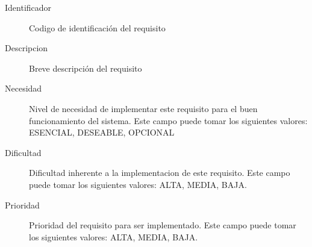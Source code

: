 \begin{description}
    \item[Identificador] Codigo de identificación del requisito
    \item[Descripcion] Breve descripción del requisito
    \item[Necesidad] Nivel de necesidad de implementar este requisito para el buen funcionamiento del sistema. Este campo puede tomar los siguientes valores: ESENCIAL, DESEABLE, OPCIONAL
    \item[Dificultad] Dificultad inherente a la implementacion de este requisito. Este campo puede tomar los siguientes valores: ALTA, MEDIA, BAJA.
    \item[Prioridad] Prioridad del requisito para ser implementado. Este campo puede tomar los siguientes valores: ALTA, MEDIA, BAJA.
\end{description}
